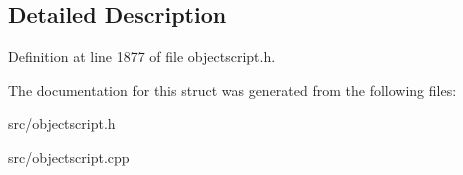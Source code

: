 \subsection{Detailed Description}


Definition at line 1877 of file objectscript.\+h.



The documentation for this struct was generated from the following files\+:\begin{DoxyCompactItemize}
\item 
src/objectscript.\+h\item 
src/objectscript.\+cpp\end{DoxyCompactItemize}

